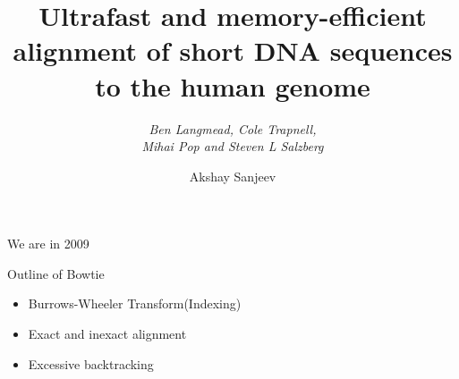 \documentclass[mathserif]{beamer}
\title{Ultrafast and memory-efficient alignment of short DNA sequences
to the human genome}
\subtitle{\textit{Ben Langmead, Cole Trapnell, \\Mihai Pop and Steven L Salzberg}}
\author{Akshay Sanjeev}
\begin{document}
\begin{frame}
    \maketitle
\end{frame}


\begin{frame}{We are in 2009}

\end{frame}

\begin{frame}{Outline of Bowtie}
    \begin{itemize}
        \item Burrows-Wheeler Transform(Indexing)
        \item Exact and inexact alignment
        \item Excessive backtracking
    \end{itemize}
\end{frame}
\end{document}
